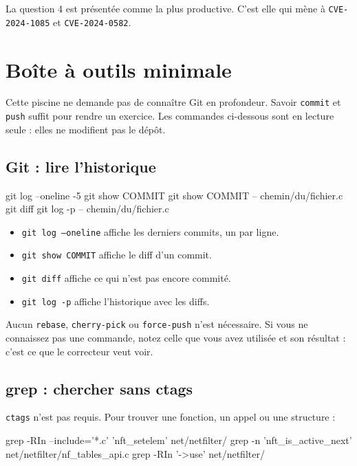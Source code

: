 \documentclass{training}
\begin{document}
La question 4 est présentée comme la plus productive. C'est elle qui mène à
\texttt{CVE-2024-1085} et \texttt{CVE-2024-0582}.

\chapter{Boîte à outils minimale}

Cette piscine ne demande pas de connaître Git en profondeur. Savoir
\texttt{commit} et \texttt{push} suffit pour rendre un exercice. Les
commandes ci-dessous sont en lecture seule : elles ne modifient pas le
dépôt.

\section*{Git : lire l'historique}

\begin{console}
git log --oneline -5
git show COMMIT
git show COMMIT -- chemin/du/fichier.c
git diff
git log -p -- chemin/du/fichier.c
\end{console}

\begin{itemize}
  \item \texttt{git log --oneline} affiche les derniers commits, un par
        ligne.
  \item \texttt{git show COMMIT} affiche le diff d'un commit.
  \item \texttt{git diff} affiche ce qui n'est pas encore commité.
  \item \texttt{git log -p} affiche l'historique avec les diffs.
\end{itemize}

Aucun \texttt{rebase}, \texttt{cherry-pick} ou \texttt{force-push} n'est
nécessaire. Si vous ne connaissez pas une commande, notez celle que vous
avez utilisée et son résultat : c'est ce que le correcteur veut voir.

\section*{grep : chercher sans ctags}

\texttt{ctags} n'est pas requis. Pour trouver une fonction, un appel ou une
structure :

\begin{console}
grep -RIn --include='*.c' 'nft_setelem' net/netfilter/
grep -n 'nft_is_active_next' net/netfilter/nf_tables_api.c
grep -RIn '->use' net/netfilter/
\end{console}
\end{document}
